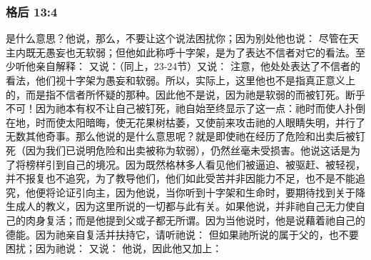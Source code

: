 
\subsubsection{格后 13:4}

\par

是什么意思？他说，那么，不要让这个说法困扰你；因为别处他也说： 尽管在天主内既无愚妄也无软弱；但他如此称呼十字架，是为了表达不信者对它的看法。至少听他亲自解释： 又说：（同上，23-24节）又说： 注意，他处处表达了不信者的看法，他们视十字架为愚妄和软弱。所以，实际上，这里他也不是指真正意义上的，而是指不信者所怀疑的那种。因此他不是说，因为祂是软弱的而被钉死。断乎不可！因为祂本有权不让自己被钉死，祂自始至终显示了这一点：祂时而使人扑倒在地，时而使太阳暗晦，使无花果树枯萎，又使前来攻击祂的人眼睛失明，并行了无数其他奇事。那么他说的是什么意思呢？就是即使祂在经历了危险和出卖后被钉死（因为我们已说明危险和出卖被称为软弱），仍然丝毫未受损害。他说这话是为了将榜样引到自己的境况。因为既然格林多人看见他们被逼迫、被驱赶、被轻视，并不报复也不追究，为了教导他们，他们如此受苦并非因能力不足，也不是不能追究，他便将论证引向主，因为他说，当你听到十字架和生命时，要期待找到关于降生成人的教义，因为这里所说的一切都与此有关。如果他说，并非祂自己无力使自己的肉身复活；而是他提到父或子都无所谓。因为当他说时，他是说藉着祂自己的德能。因为祂亲自复活并扶持它，请听祂说： 但如果祂所说的属于父的，也不要困扰；因为祂说： 又说： 他说，因此他又加上：\par

